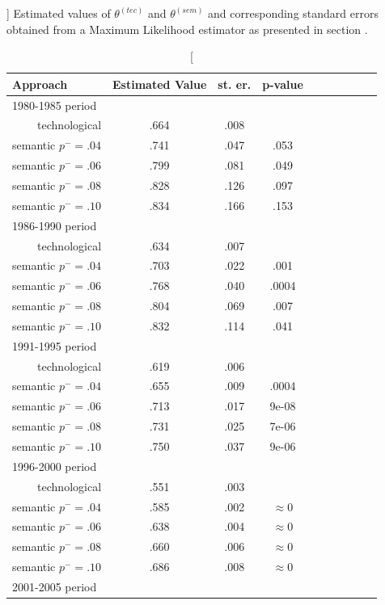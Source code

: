 \begin{table}[!ht]
\centering
\caption[][]{}{\label{summary} Estimated values of $\theta^{(tec)}$ and $\theta^{(sem)}$ and corresponding standard errors obtained from a Maximum Likelihood estimator as presented in section .}
\label{stdQMLE}
\begin{tabular}{@{}rccccccccc@{}}
\hline
\multicolumn{1}{l}{Approach} & \multicolumn{1}{l}{Estimated Value} & \multicolumn{1}{l}{st. er.} & \multicolumn{1}{l}{p-value} \\ \hline
\multicolumn{4}{l}{1980-1985 period} \\
technological & .664 &.008&\\
semantic $p^{-} = .04$ & .741 &.047 & .053\\
semantic $p^{-} = .06$ & .799 &.081 & .049\\
semantic $p^{-} = .08$ & .828 &.126 & .097\\
semantic $p^{-} = .10$ & .834 &.166 & .153\\
\multicolumn{4}{l}{1986-1990 period} \\
technological & .634 &.007&\\
semantic $p^{-} = .04$ & .703 &.022 & .001\\
semantic $p^{-} = .06$ & .768 &.040 & .0004\\
semantic $p^{-} = .08$ & .804 &.069 & .007\\
semantic $p^{-} = .10$ & .832 &.114 & .041\\
\multicolumn{4}{l}{1991-1995 period} \\
technological & .619 &.006&\\
semantic $p^{-} = .04$ & .655 &.009 & .0004\\
semantic $p^{-} = .06$ & .713 &.017 & 9e-08\\
semantic $p^{-} = .08$ & .731 &.025 & 7e-06\\
semantic $p^{-} = .10$ & .750 &.037 & 9e-06\\
\multicolumn{4}{l}{1996-2000 period} \\
technological & .551 &.003&\\
semantic $p^{-} = .04$ & .585 &.002 & $\approx 0$\\
semantic $p^{-} = .06$ & .638 &.004 & $\approx 0$\\
semantic $p^{-} = .08$ & .660 &.006 & $\approx 0$\\
semantic $p^{-} = .10$ & .686 &.008 & $\approx 0$\\
\multicolumn{4}{l}{2001-2005 period} \\

\end{tabular}
\end{table}
